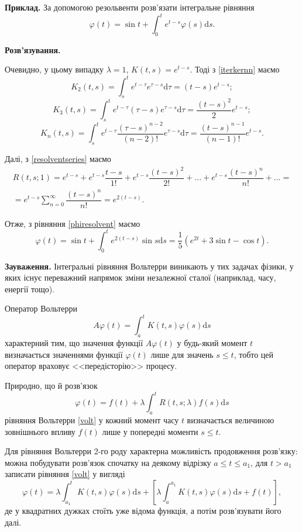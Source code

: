 \documentclass[14pt,twoside]{extreport}
\theoremstyle{mystyle}
\numberwithin{equation}{chapter}
\begin{document}
\begin{small}
 \textbf{Приклад.} За допомогою резольвенти розв'язати інтегральне рівняння
 \[
  \varphi(t) = \sin t + \int_{0}^{t} e^{t-s} \varphi(s) \mathrm{d}s.
 \]

 \textbf{Розв'язування.}
 
 Очевидно, у цьому випадку $\lambda =1$, $K(t,s) = e^{t-s}$. Тоді з \eqref{iterkernn} маємо
 \[
  K_2(t,s) = \int_{s}^{t} e^{t-\tau} e^{\tau -s} \mathrm{d}\tau = (t-s) e^{t-s};
 \]
\[
 K_3(t,s) = \int_{s}^{t} e^{t-\tau} (\tau-s) e^{\tau -s} \mathrm{d}\tau = \dfrac{(t-s)^2}{2} e^{t-s};
\]
\[
 K_n(t,s) = \int_{s}^{t} e^{t-\tau} \dfrac{(\tau -s)^{n-2}}{(n-2)!} e^{\tau -s} \mathrm{d}\tau = \dfrac{(t-s)^{n-1}}{(n-1)!} e^{t-s}.
\]

Далі, з \eqref{resolventseries} маємо
\begin{multline*}
 R(t,s;1) = e^{t-s} + e^{t-s}\dfrac{t-s}{1!} + e^{t-s}\dfrac{(t-s)^2}{2!} + \ldots + e^{t-s}\dfrac{(t-s)^n}{n!} + \ldots =\\
 =e^{t-s} \sum_{n=0}^{\infty}\dfrac{(t-s)^n}{n!} = e^{2(t-s)}.
\end{multline*}

Отже, з рівняння \eqref{phiresolvent} маємо
\[
 \varphi(t) = \sin t + \int_{0}^{t} e^{2(t-s)} \sin s\mathrm{d}s = \dfrac{1}{5}\left( e^{2t} + 3\sin t -\cos t\right).
\]
\end{small}

\textbf{Зауваження.} Інтегральні рівняння Вольтерри виникають у тих задачах фізики, у яких існує переважний напрямок зміни незалежної сталої (наприклад, часу, енергії тощо).

Оператор Вольтерри
\[
A\varphi(t) = \int_{a}^{t} K(t, s) \varphi(s) \mathrm{d}s
\]
характерний тим, що значення функції $A\varphi(t)$ у будь-який момент $t$ визначається значеннями функції $\varphi(t)$ лише для значень $s \leqslant t$, тобто цей оператор враховує <<передісторію>> процесу.

Природно, що й розв'язок
\[
\varphi(t) = f(t) + \lambda \int_{a}^{t} R(t, s; \lambda) f(s) \mathrm{d}s
\]
рівняння Вольтерри \eqref{volt} у кожний момент часу $t$ визначається величиною зовнішнього впливу $f(t)$ лише у попередні моменти $s \leqslant t$.

Для рівняння Вольтерри 2-го роду характерна можливість продовження розв'язку: можна побудувати розв'язок спочатку на деякому відрізку $a \leqslant t \leqslant a_1$, для $t > a_1$ записати рівняння \eqref{volt} у вигляді
\[
\varphi(t) = \lambda \int_{a_1}^{t} K(t, s) \varphi(s) \mathrm{d}s + \left[\lambda \int_{a}^{a_1} K(t, s) \varphi(s) \mathrm{d}s + f(t)\right],
\]
де у квадратних дужках стоїть уже відома функція, а потім розв'язувати його далі.
\end{document}
